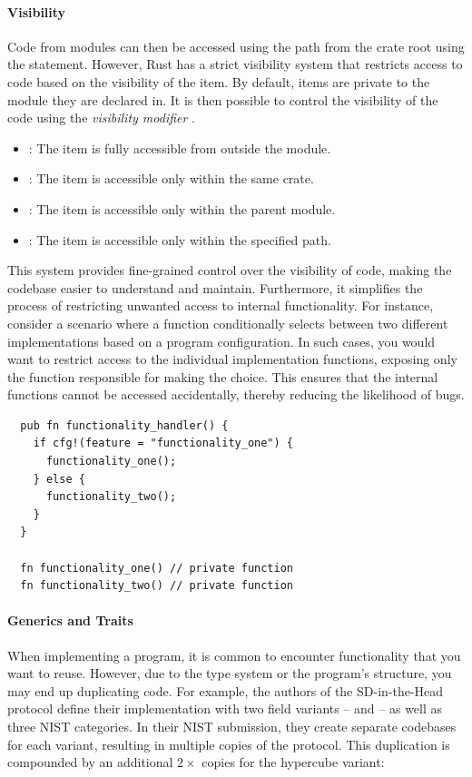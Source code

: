 \documentclass[11pt]{report}
\theoremstyle{definition}
\theoremstyle{plain}
\begin{document}
\paragraph{Visibility} %
Code from modules can then be accessed using the path from the crate root using the  statement. However, Rust has a strict visibility system that restricts access to code based on the visibility of the item. By default, items are private to the module they are declared in. It is then possible to control the visibility of the code using the \textit{visibility modifier} .
\begin{itemize}[parsep=0pt, itemsep=0pt]
  \item {}: The item is fully accessible from outside the module.
  \item {}: The item is accessible only within the same crate.
  \item {}: The item is accessible only within the parent module.
  \item {}: The item is accessible only within the specified path.
\end{itemize}
This system provides fine-grained control over the visibility of code, making the codebase easier to understand and maintain. Furthermore, it simplifies the process of restricting unwanted access to internal functionality. For instance, consider a scenario where a function conditionally selects between two different implementations based on a program configuration. In such cases, you would want to restrict access to the individual implementation functions, exposing only the function responsible for making the choice. This ensures that the internal functions cannot be accessed accidentally, thereby reducing the likelihood of bugs.
\begin{verbatim}
  pub fn functionality_handler() {
    if cfg!(feature = "functionality_one") {
      functionality_one();
    } else {
      functionality_two();
    }
  }

  fn functionality_one() // private function
  fn functionality_two() // private function
\end{verbatim}

\paragraph{Generics and Traits}

When implementing a program, it is common to encounter functionality that you want to reuse. However, due to the type system or the program's structure, you may end up duplicating code. For example, the authors of the SD-in-the-Head protocol define their implementation with two field variants --  and  -- as well as three NIST categories. In their NIST submission, they create separate codebases for each variant, resulting in multiple copies of the protocol. This duplication is compounded by an additional $2\times$ copies for the hypercube variant:
\end{document}
